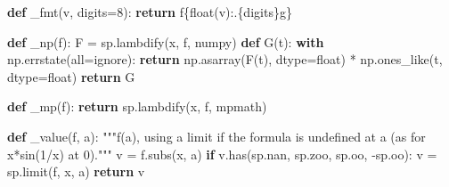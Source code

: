 \documentclass[
  letterpaper,
  DIV=11,
  numbers=noendperiod]{scrreprt}
\newenvironment{Shaded}{\begin{snugshade}}{\end{snugshade}}
\newcommand{\BuiltInTok}[1]{\textcolor[rgb]{0.00,0.23,0.31}{#1}}
\newcommand{\CommentTok}[1]{\textcolor[rgb]{0.37,0.37,0.37}{#1}}
\newcommand{\ControlFlowTok}[1]{\textcolor[rgb]{0.00,0.23,0.31}{\textbf{#1}}}
\newcommand{\DecValTok}[1]{\textcolor[rgb]{0.68,0.00,0.00}{#1}}
\newcommand{\KeywordTok}[1]{\textcolor[rgb]{0.00,0.23,0.31}{\textbf{#1}}}
\newcommand{\NormalTok}[1]{\textcolor[rgb]{0.00,0.23,0.31}{#1}}
\newcommand{\OperatorTok}[1]{\textcolor[rgb]{0.37,0.37,0.37}{#1}}
\newcommand{\SpecialCharTok}[1]{\textcolor[rgb]{0.37,0.37,0.37}{#1}}
\newcommand{\SpecialStringTok}[1]{\textcolor[rgb]{0.13,0.47,0.30}{#1}}
\newcommand{\StringTok}[1]{\textcolor[rgb]{0.13,0.47,0.30}{#1}}
\theoremstyle{plain}
\theoremstyle{plain}
\theoremstyle{definition}
\theoremstyle{definition}
\theoremstyle{definition}
\theoremstyle{plain}
\theoremstyle{plain}
\theoremstyle{remark}
\begin{document}
\begin{Shaded}
\begin{Highlighting}[]
\KeywordTok{def}\NormalTok{ \_fmt(v, digits}\OperatorTok{=}\DecValTok{8}\NormalTok{):}
    \ControlFlowTok{return} \SpecialStringTok{f\textquotesingle{}}\SpecialCharTok{\{}\BuiltInTok{float}\NormalTok{(v)}\SpecialCharTok{:.}\NormalTok{\{digits\}g}\SpecialCharTok{\}}\SpecialStringTok{\textquotesingle{}}


\KeywordTok{def}\NormalTok{ \_np(f):}
\NormalTok{    F }\OperatorTok{=}\NormalTok{ sp.lambdify(x, f, }\StringTok{\textquotesingle{}numpy\textquotesingle{}}\NormalTok{)}
    \KeywordTok{def}\NormalTok{ G(t):}
        \ControlFlowTok{with}\NormalTok{ np.errstate(}\BuiltInTok{all}\OperatorTok{=}\StringTok{\textquotesingle{}ignore\textquotesingle{}}\NormalTok{):}
            \ControlFlowTok{return}\NormalTok{ np.asarray(F(t), dtype}\OperatorTok{=}\BuiltInTok{float}\NormalTok{) }\OperatorTok{*}\NormalTok{ np.ones\_like(t, dtype}\OperatorTok{=}\BuiltInTok{float}\NormalTok{)}
    \ControlFlowTok{return}\NormalTok{ G}


\KeywordTok{def}\NormalTok{ \_mp(f):}
    \ControlFlowTok{return}\NormalTok{ sp.lambdify(x, f, }\StringTok{\textquotesingle{}mpmath\textquotesingle{}}\NormalTok{)}


\KeywordTok{def}\NormalTok{ \_value(f, a):}
    \CommentTok{"""f(a), using a limit if the formula is undefined at a (as for x*sin(1/x) at 0)."""}
\NormalTok{    v }\OperatorTok{=}\NormalTok{ f.subs(x, a)}
    \ControlFlowTok{if}\NormalTok{ v.has(sp.nan, sp.zoo, sp.oo, }\OperatorTok{{-}}\NormalTok{sp.oo):}
\NormalTok{        v }\OperatorTok{=}\NormalTok{ sp.limit(f, x, a)}
    \ControlFlowTok{return}\NormalTok{ v}



\end{Highlighting}
\end{Shaded}
\end{document}
